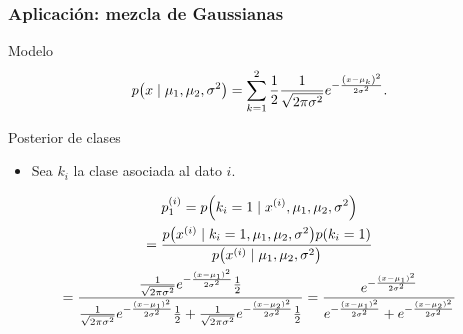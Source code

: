 \documentclass[table]{beamer}
\begin{document}
\begin{frame}
    \frametitle{Aplicación: mezcla de Gaussianas}
    \begin{exampleblock}{Modelo}
        \begin{equation*}
            \pdf{x \mid \mu_{1} , \mu_{2} , \sigma^{2}} = \sum_{k = 1}^{2} \frac{1}{2} \frac{1}{\sqrt{2 \pi \sigma^{2}}} e^{- \frac{\parens{x - \mu_{k}}^{2}}{2 \sigma^{2}}} .
        \end{equation*}
    \end{exampleblock}
    \begin{block}{Posterior de clases}
        \begin{itemize}
            \item Sea $k_{i}$ la clase asociada al dato $i$.
        \end{itemize}
        \begin{multline*}
            p^{\parens{i}}_{1} = \pdf{k_{i} = 1 \mid x^{\parens{i}} , \mu_{1} , \mu_{2} , \sigma^{2}}
            \\
            = \frac{\pdf{x^{\parens{i}} \mid k_{i} = 1 , \mu_{1} , \mu_{2} , \sigma^{2}} \pdf{k_{i} = 1}}{\pdf{x^{\parens{i}} \mid \mu_{1} , \mu_{2}, \sigma^{2}}}
            \\
            = \frac{\frac{1}{\sqrt{2 \pi \sigma^{2}}} e^{- \frac{\parens{x - \mu_{1}}^{2}}{2 \sigma^{2}}} \frac{1}{2}}{\frac{1}{\sqrt{2 \pi \sigma^{2}}} e^{- \frac{\parens{x - \mu_{1}}^{2}}{2 \sigma^{2}}} \frac{1}{2} + \frac{1}{\sqrt{2 \pi \sigma^{2}}} e^{- \frac{\parens{x - \mu_{2}}^{2}}{2 \sigma^{2}}} \frac{1}{2}}
            = \frac{e^{- \frac{\parens{x - \mu_{1}}^{2}}{2 \sigma^{2}}}}{e^{- \frac{\parens{x - \mu_{1}}^{2}}{2 \sigma^{2}}} + e^{- \frac{\parens{x - \mu_{2}}^{2}}{2 \sigma^{2}}}}
        \end{multline*}
    \end{block}
\end{frame}
\end{document}
